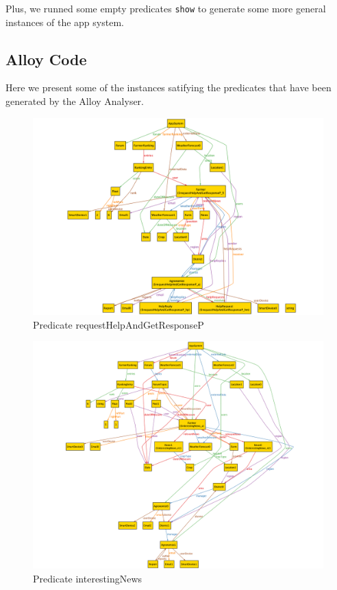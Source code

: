 \documentclass[table, 12pt]{article}
\begin{document}
Plus, we runned some empty predicates \texttt{show} to generate some more general instances of the app system.

\subsection{Alloy Code}



Here we present some of the instances satifying the predicates that have been generated by the Alloy Analyser.

\begin{center}
    \begin{figure}[H]
        \includegraphics[scale=0.40, center]{assets/AlloyInstances/helpRequests.png}
        \caption{Predicate requestHelpAndGetResponseP}
        \label{fig: helpRequestAlloy}
    \end{figure}
\end{center}

\begin{center}
    \begin{figure}[H]
        \includegraphics[scale=0.40, center]{assets/AlloyInstances/interestingNews.png}
        \caption{Predicate interestingNews}
        \label{fig: interestingNews}
    \end{figure}
\end{center}
\end{document}
